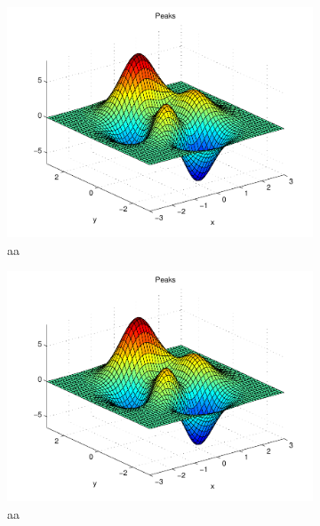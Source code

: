 \begin{figure}[h]
\small
\centering
\begin{subfigure}[b]{0.45\textwidth}
	\includegraphics[width=\textwidth]{mcmthesis-aaa-eps-converted-to.pdf}
	\caption{aa} 
	\label{fig:aa1}
\end{subfigure}
\begin{subfigure}[b]{0.45\textwidth}
	\includegraphics[width=\textwidth]{mcmthesis-aaa-eps-converted-to.pdf}
	\caption{aa} 
	\label{fig:aa2}
\end{subfigure}
\begin{subfigure}[b]{0.45\textwidth}

\end{subfigure}
\end{figure}
